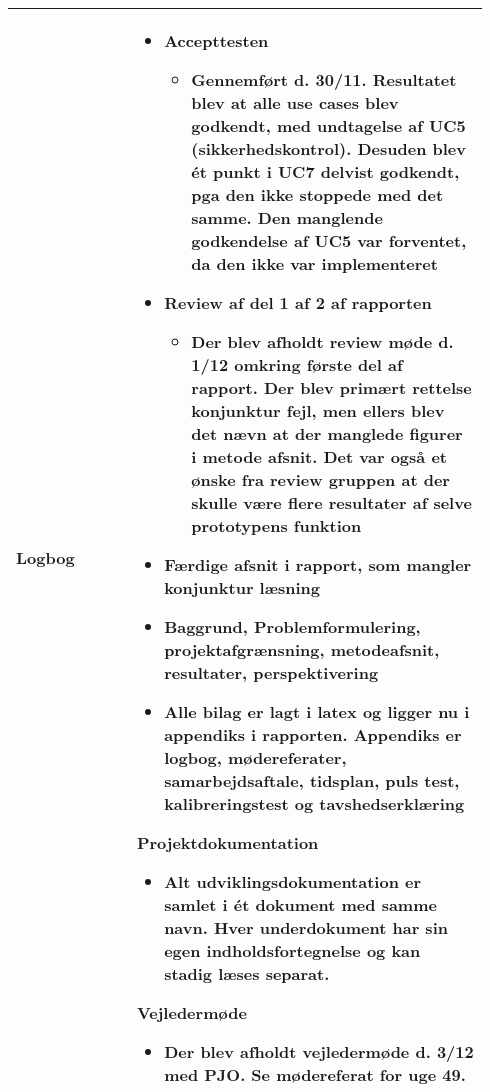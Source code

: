 \begin{longtable}{|p{0.24\linewidth}|p{0.7\linewidth}|}
		\\ \hline
		Logbog & 
		\begin{itemize}
			\item Accepttesten 
			\begin{itemize}
				\item Gennemført d. 30/11. Resultatet blev at alle use cases blev godkendt, med undtagelse af UC5 (sikkerhedskontrol). Desuden blev ét punkt i UC7 delvist godkendt, pga den ikke stoppede med det samme. Den manglende godkendelse af UC5 var forventet, da den ikke var implementeret
			\end{itemize}
			\item Review af del 1 af 2 af rapporten
			\begin{itemize}
				\item Der blev afholdt review møde d. 1/12 omkring første del af rapport. Der blev primært rettelse konjunktur fejl, men ellers blev det nævn at der manglede figurer i metode afsnit. Det var også et ønske fra review gruppen at der skulle være flere resultater af selve prototypens funktion
			\end{itemize}
			\item Færdige afsnit i rapport, som mangler konjunktur læsning
				\item Baggrund, Problemformulering, projektafgrænsning, metodeafsnit, resultater, perspektivering
				\item Alle bilag er lagt i latex og ligger nu i appendiks i rapporten. Appendiks er logbog, mødereferater, samarbejdsaftale, tidsplan, puls test, kalibreringstest og tavshedserklæring
			\end{itemize}
			\item Projektdokumentation
			\begin{itemize}
				\item Alt udviklingsdokumentation er samlet i ét dokument med samme navn. Hver underdokument har sin egen indholdsfortegnelse og kan stadig læses separat. 
			\end{itemize}
			\item Vejledermøde
			\begin{itemize}
				\item Der blev afholdt vejledermøde d. 3/12 med PJO. Se mødereferat for uge 49. 
			\end{itemize}
		\end{itemize}
		\\ \hline
	\end{longtable}
	
